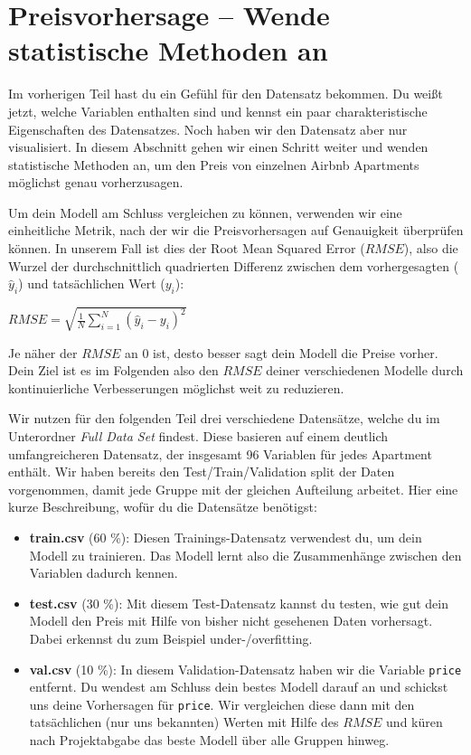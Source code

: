 \documentclass[
]{book}
\providecommand{\tightlist}{%
  \setlength{\itemsep}{0pt}\setlength{\parskip}{0pt}}
\begin{document}
\hypertarget{preisvorhersage-wende-statistische-methoden-an-1}{%
\chapter{Preisvorhersage -- Wende statistische Methoden an}\label{preisvorhersage-wende-statistische-methoden-an-1}}

Im vorherigen Teil hast du ein Gefühl für den Datensatz bekommen. Du weißt jetzt, welche Variablen enthalten sind und kennst ein paar charakteristische Eigenschaften des Datensatzes. Noch haben wir den Datensatz aber nur visualisiert. In diesem Abschnitt gehen wir einen Schritt weiter und wenden statistische Methoden an, um den Preis von einzelnen Airbnb Apartments möglichst genau vorherzusagen.

Um dein Modell am Schluss vergleichen zu können, verwenden wir eine einheitliche Metrik, nach der wir die Preisvorhersagen auf Genauigkeit überprüfen können.
In unserem Fall ist dies der Root Mean Squared Error (\(RMSE\)), also die Wurzel der durchschnittlich quadrierten Differenz zwischen dem vorhergesagten (\(\hat{y}_i\)) und tatsächlichen Wert (\(y_i\)):

\begin{center}
$RMSE = \sqrt{\frac{1}{N}\sum_{i=1}^{N}{(\hat{y}_i-y_i)^2}}$
\end{center}

Je näher der \(RMSE\) an 0 ist, desto besser sagt dein Modell die Preise vorher.
Dein Ziel ist es im Folgenden also den \(RMSE\) deiner verschiedenen Modelle durch kontinuierliche Verbesserungen möglichst weit zu reduzieren.

Wir nutzen für den folgenden Teil drei verschiedene Datensätze, welche du im Unterordner \emph{Full Data Set} findest.
Diese basieren auf einem deutlich umfangreicheren Datensatz, der insgesamt 96 Variablen für jedes Apartment enthält.
Wir haben bereits den Test/Train/Validation split der Daten vorgenommen, damit jede Gruppe mit der gleichen Aufteilung arbeitet.
Hier eine kurze Beschreibung, wofür du die Datensätze benötigst:

\begin{itemize}
\tightlist
\item
  \textbf{train.csv} (60 \%): Diesen Trainings-Datensatz verwendest du, um dein Modell zu trainieren. Das Modell lernt also die Zusammenhänge zwischen den Variablen dadurch kennen.
\item
  \textbf{test.csv} (30 \%): Mit diesem Test-Datensatz kannst du testen, wie gut dein Modell den Preis mit Hilfe von bisher nicht gesehenen Daten vorhersagt. Dabei erkennst du zum Beispiel under-/overfitting.
\item
  \textbf{val.csv} (10 \%): In diesem Validation-Datensatz haben wir die Variable \texttt{price} entfernt. Du wendest am Schluss dein bestes Modell darauf an und schickst uns deine Vorhersagen für \texttt{price}. Wir vergleichen diese dann mit den tatsächlichen (nur uns bekannten) Werten mit Hilfe des \(RMSE\) und küren nach Projektabgabe das beste Modell über alle Gruppen hinweg.
\end{itemize}
\end{document}
